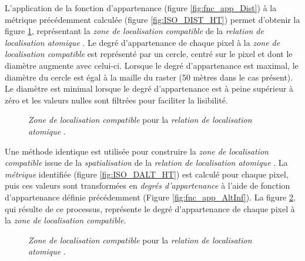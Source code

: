 L’application de la fonction d'appartenance (figure
\ref{fig:fnc_app_Dist}) à la métrique précédemment calculée (figure
\ref{fig:ISO_DIST_HT}) permet d'obtenir la figure
\ref{fig:ZLC_DIST_HT}, représentant la \emph{zone de localisation
  compatible} de la \emph{relation de localisation atomique}
. Le degré d'appartenance de chaque pixel à la
\emph{zone de localisation compatible} est représenté par un cercle,
centré sur le pixel et dont le diamètre augmente avec
celui-ci. Lorsque le degré d'appartenance est maximal, le diamètre du
cercle est égal à la maille du raster (50 mètres dans le cas
présent). Le diamètre est minimal lorsque le degré d'appartenance est
à peine supérieur à zéro et les valeurs nulles sont filtrées pour
faciliter la lisibilité.

\begin{figure}
  \centering
  
  \caption{\emph{Zone de localisation compatible} pour la
    \emph{relation de localisation atomique}
    \protect{}.}
  \label{fig:ZLC_DIST_HT}
\end{figure}

Une méthode identique est utilisée pour construire la \emph{zone de
  localisation compatible} issue de la \emph{spatialisation} de la
\emph{relation de localisation atomique}
. La
\emph{métrique} identifiée (figure \ref{fig:ISO_DALT_HT}) est calculé
pour chaque pixel, puis ces valeurs sont transformées en \emph{degrés
  d'appartenance} à l'aide de fonction d'appartenance définie
précédemment (Figure \ref{fig:fnc_app_AltInf}). La figure
\ref{fig:ZLC_ALTINF_HT}, qui résulte de ce processus, représente le
degré d'appartenance de chaque pixel à la \emph{zone de localisation
  compatible.}

\begin{figure}
  \centering
  
  \caption{\emph{Zone de localisation compatible} pour la
    \emph{relation de localisation atomique}
    \protect{}.}
  \label{fig:ZLC_ALTINF_HT}
\end{figure}

